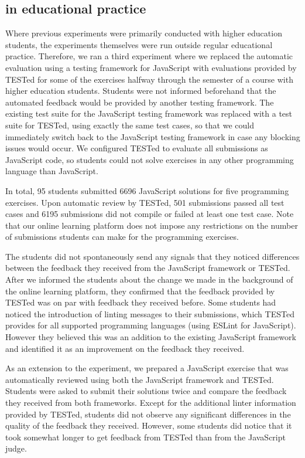 \documentclass[../main]{subfiles}
\begin{document}
\subsection{\tested{} in educational practice}\label{subsec:tested-in-educational-practice}

Where previous experiments were primarily conducted with higher education students, the experiments themselves were run outside regular educational practice.
Therefore, we ran a third experiment where we replaced the automatic evaluation using a testing framework for JavaScript with evaluations provided by TESTed for some of the exercises halfway through the semester of a course with higher education students.
Students were not informed beforehand that the automated feedback would be provided by another testing framework.
The existing test suite for the JavaScript testing framework was replaced with a test suite for TESTed, using exactly the same test cases, so that we could immediately switch back to the JavaScript testing framework in case any blocking issues would occur.
We configured TESTed to evaluate all submissions as JavaScript code, so students could not solve exercises in any other programming language than JavaScript.

In total, \num{95} students submitted \num{6696} JavaScript solutions for five programming exercises.
Upon automatic review by TESTed, \num{501} submissions passed all test cases and \num{6195} submissions did not compile or failed at least one test case.
Note that our online learning platform does not impose any restrictions on the number of submissions students can make for the programming exercises.

The students did not spontaneously send any signals that they noticed differences between the feedback they received from the JavaScript framework or TESTed.
After we informed the students about the change we made in the background of the online learning platform, they confirmed that the feedback provided by TESTed was on par with feedback they received before.
Some students had noticed the introduction of linting messages to their submissions, which TESTed provides for all supported programming languages (using ESLint for JavaScript).
However they believed this was an addition to the existing JavaScript framework and identified it as an improvement on the feedback they received.

As an extension to the experiment, we prepared a JavaScript exercise that was automatically reviewed using both the JavaScript framework and TESTed.
Students were asked to submit their solutions twice and compare the feedback they received from both frameworks.
Except for the additional linter information provided by TESTed, students did not observe any significant differences in the quality of the feedback they received.
However, some students did notice that it took somewhat longer to get feedback from TESTed than from the JavaScript judge.
\end{document}
